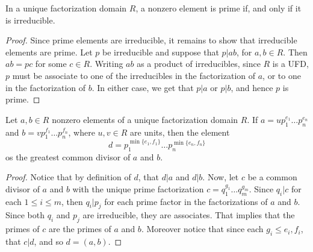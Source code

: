 \begin{lemma}\label{lemma_6.3.3}
  In a unique factorization domain $R$, a nonzero element is prime if, and
  only if it is irreducible.
\end{lemma}
\begin{proof}
  Since prime elements are irreducible, it remains to show that irreducible
  elements are prime. Let $p$ be irreducible and suppose that  $p|ab$, for
  $a,b \in R$. Then  $ab=pc$ for some  $c \in R$. Writing  $ab$ as a product
  of irreducibles, since  $R$ is a UFD,  $p$ must be associate to one of the
  irreducibles in the factorization of $a$, or to one in the factorization of
  $b$. In either case, we get that $p|a$ or $p|b$, and hence  $p$ is prime.
\end{proof}

\begin{lemma}\label{lemma_6.3.4}
  Let $a,b \in R$ nonzero elements of a unique factorization domain $R$. If
  $a=up_1^{e_1} \dots p_n^{e_n}$ and $b=vp_1^{f_1} \dots p_n^{f_n}$, where
  $u,v \in R$ are units, then the element
  \begin{equation*}
    d=p_1^{\min\{e_1,f_1\}} \dots p_n^{\min\{e_n,f_n\}}
  \end{equation*}
  os the greatest common divisor of $a$ and  $b$.
\end{lemma}
\begin{proof}
  Notice that by definition of $d$, that  $d|a$ and  $d|b$. Now, let  $c$ be a
  common divisor of  $a$ and  $b$ with the unique prime factorization
  $c=q_1^{g_1} \dots q_m^{g_m}$. Since $q_i|c$ for each  $1 \leq i \leq m$,
  then  $q_i|p_j$ for each prime factor in the factorizations of  $a$ and
  $b$. Since both  $q_i$ and  $p_j$ are irreducible, they are associates. That
  implies that the primes of  $c$ are the primes of  $a$ and  $b$. Moreover
  notice that since each $g_i \leq e_i,f_i$, that  $c|d$, and so  $d=(a,b)$.
\end{proof}

